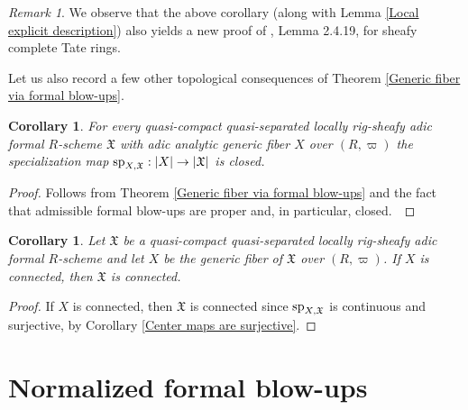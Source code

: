 \documentclass[12pt,twoside,a4paper]{article}
\newtheorem{cor}[thm]{Corollary}
\theoremstyle{definition}
\theoremstyle{remark}
\newtheorem{rmk}[thm]{Remark}
\newcommand\spc{{\rm sp}}
\begin{document}
\begin{rmk}We observe that the above corollary (along with Lemma \ref{Local explicit description}) also yields a new proof of \cite{Kedlaya-Liu}, Lemma 2.4.19, for sheafy complete Tate rings.\end{rmk}
Let us also record a few other topological consequences of Theorem \ref{Generic fiber via formal blow-ups}.
\begin{cor}\label{The specialization map is closed}For every quasi-compact quasi-separated locally rig-sheafy adic formal $R$-scheme $\mathfrak{X}$ with adic analytic generic fiber $X$ over $(R, \varpi)$ the specialization map $\spc_{X,\mathfrak{X}}: \vert X\vert\to \vert\mathfrak{X}\vert$ is closed.\end{cor}
\begin{proof}Follows from Theorem \ref{Generic fiber via formal blow-ups} and the fact that admissible formal blow-ups are proper and, in particular, closed. \end{proof}
\begin{cor}\label{Connectedness and generic fiber}Let $\mathfrak{X}$ be a quasi-compact quasi-separated locally rig-sheafy adic formal $R$-scheme and let $X$ be the generic fiber of $\mathfrak{X}$ over $(R, \varpi)$. If $X$ is connected, then $\mathfrak{X}$ is connected.\end{cor}
\begin{proof}If $X$ is connected, then $\mathfrak{X}$ is connected since $\spc_{X,\mathfrak{X}}$ is continuous and surjective, by Corollary \ref{Center maps are surjective}. \end{proof}

\section{Normalized formal blow-ups}\label{sec:normalized formal blow-ups}
\end{document}
